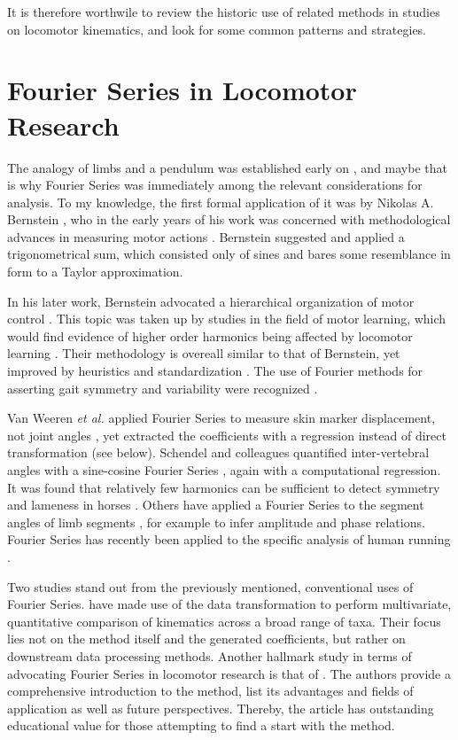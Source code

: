 It is therefore worthwile to review the historic use of related methods in studies on locomotor kinematics, and look for some common patterns and strategies.

\FloatBarrier\clearpage
\section{Fourier Series in Locomotor Research}
\label{history}
The analogy of limbs and a pendulum was established early on \citep{Weber1836,Braune1895}, and maybe that is why Fourier Series was immediately among the relevant considerations for analysis.
To my knowledge, the first formal application of it was by Nikolas A. Bernstein \citep{Bernstein1927a,Bernstein1935}, who in the early years of his work was concerned with methodological advances in measuring motor actions \citep{Bongaardt2000}.
Bernstein suggested and applied a trigonometrical sum, which consisted only of sines and bares some resemblance in form to a Taylor approximation.

In his later work, Bernstein advocated a hierarchical organization of motor control \citep[\textit{cf.}][]{Bongaardt2000}.
This topic was taken up by studies in the field of motor learning, which would find evidence of higher order harmonics being affected by locomotor learning \citep{Gallistel1982,Marteniuk1983}.
Their methodology is overeall similar to that of Bernstein, yet improved by heuristics and standardization \citep{Jackson1979,Porges1980}.
The use of Fourier methods for asserting gait symmetry and variability were recognized \citep{Soudan1982}.


Van Weeren \emph{et al.} applied Fourier Series to measure skin marker displacement, not joint angles \citep{vanWeeren1992}, yet extracted the coefficients with a regression instead of direct transformation (see below).
Schendel and colleagues quantified inter-vertebral angles with a sine-cosine Fourier Series \citep{Schendel1995}, again with a computational regression.
It was found that relatively few harmonics can be sufficient to detect symmetry and lameness in horses \citep{Audigie1999,Peham1996}.
Others have applied a Fourier Series to the segment angles of limb segments \citep{Grasso2000}, for example to infer amplitude and phase relations.
Fourier Series has recently been applied to the specific analysis of human running \citep{Skejo2021}.


Two studies stand out from the previously mentioned, conventional uses of Fourier Series.
\citet{Pike2002} have made use of the data transformation to perform multivariate, quantitative comparison of kinematics across a broad range of taxa.
Their focus lies not on the method itself and the generated coefficients, but rather on downstream data processing methods.
Another hallmark study in terms of advocating Fourier Series in locomotor research is that of \citet{Webb2007}.
The authors provide a comprehensive introduction to the method, list its advantages and fields of application as well as future perspectives.
Thereby, the article has outstanding educational value for those attempting to find a start with the method.


